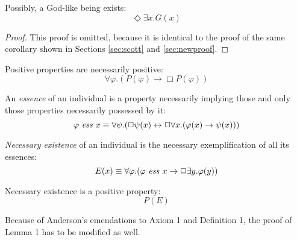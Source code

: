 \documentclass[smallextended]{svjour3}
\newcommand{\imp}{\rightarrow}
\newcommand{\biimp}{\leftrightarrow}
\newcommand{\all}{\forall}
\newcommand{\ex}{\exists}
\newcommand{\nec}{\Box} %
\newcommand{\pos}{\Diamond} %
\begin{document}
\begin{corollary}
\label{A:C1}
Possibly, a God-like being exists:
$$
\pos \ex x. G(x)
$$
\end{corollary}
\begin{proof}
This proof is omitted, because it is identical to the proof of the same corollary shown in Sections \ref{sec:scott} and \ref{sec:newproof}.
\end{proof}




\begin{axiom}[As in Scott's]
\label{A:A4}
Positive properties are necessarily positive:
$$
\all \varphi.(P(\varphi) \to \Box P(\varphi))
$$
\end{axiom}

\begin{definition}[Emended]
\label{A:D2}
An \emph{essence} of an individual is a property necessarily implying those and only those properties necessarily possessed by it:
$$
\ess{\varphi}{x} \equiv \all \psi. (\nec \psi(x) \biimp \nec \all x. (\varphi(x) \imp \psi(x)))
$$
\end{definition}



\begin{definition}[As in Scott's]
\label{A:D3}
\emph{Necessary existence} of an individual is the necessary exemplification of all its essences:
$$
E(x) \equiv \all \varphi.(\ess{\varphi}{x} \imp \nec \ex y.\varphi(y))
$$
\end{definition}


\begin{axiom}[As in Scott's]
\label{A:A5}
Necessary existence is a positive property:
$$
P(E)
$$
\end{axiom}


Because of Anderson's emendations to Axiom 1 and Definition 1, the proof of Lemma 1 has to be modified as well. 
\end{document}
